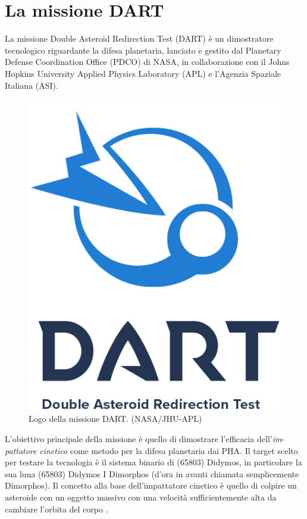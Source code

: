 \chapter{La missione DART}\label{ch:ch_3}

La missione Double Asteroid Redirection Test (DART) è un dimostratore tecnologico riguardante la difesa planetaria, lanciato e gestito dal Planetary Defense Coordination Office (PDCO) di NASA, in collaborazione con il Johns Hopkins University Applied Physics Laboratory (APL) e l'Agenzia Spaziale Italiana (ASI).

\begin{figure}[!h]
    \centering
    \includegraphics[scale=0.5]{figure/DART_mission_patch.png}
    \caption[Logo della missione DART.]{Logo della missione DART. (NASA/JHU-APL)}
    \label{fig:logo_DART}
\end{figure}

L'obiettivo principale della missione è quello di dimostrare l'efficacia dell'\textit{im}-\\
\textit{pattatore} \textit{cinetico} come metodo per la difesa planetaria dai PHA. Il target scelto per testare la tecnologia è il sistema binario di (65803) Didymos, in particolare la sua luna (65803) Didymos I Dimorphos (d'ora in avanti chiamata semplicemente Dimorphos). Il concetto alla base dell'impattatore cinetico è quello di colpire un asteroide con un oggetto massivo con una velocità sufficientemente alta da cambiare l'orbita del corpo \citep{rivkin_double_2021}.

